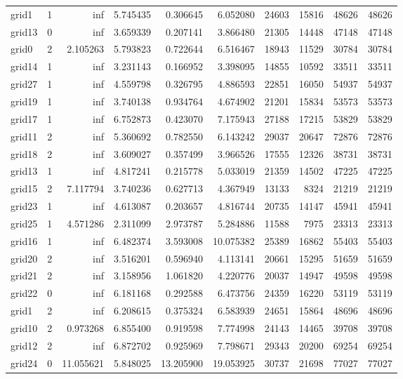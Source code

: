 \begin{longtable}{|l|r|r|r|r|r|r|r|r|r|}
grid1 & 1 & inf & 5.745435 & 0.306645 & 6.052080 & 24603 & 15816 & 48626 & 48626 \\
grid13 & 0 & inf & 3.659339 & 0.207141 & 3.866480 & 21305 & 14448 & 47148 & 47148 \\
grid0 & 2 & 2.105263 & 5.793823 & 0.722644 & 6.516467 & 18943 & 11529 & 30784 & 30784 \\
grid14 & 1 & inf & 3.231143 & 0.166952 & 3.398095 & 14855 & 10592 & 33511 & 33511 \\
grid27 & 1 & inf & 4.559798 & 0.326795 & 4.886593 & 22851 & 16050 & 54937 & 54937 \\
grid19 & 1 & inf & 3.740138 & 0.934764 & 4.674902 & 21201 & 15834 & 53573 & 53573 \\
grid17 & 1 & inf & 6.752873 & 0.423070 & 7.175943 & 27188 & 17215 & 53829 & 53829 \\
grid11 & 2 & inf & 5.360692 & 0.782550 & 6.143242 & 29037 & 20647 & 72876 & 72876 \\
grid18 & 2 & inf & 3.609027 & 0.357499 & 3.966526 & 17555 & 12326 & 38731 & 38731 \\
grid13 & 1 & inf & 4.817241 & 0.215778 & 5.033019 & 21359 & 14502 & 47225 & 47225 \\
grid15 & 2 & 7.117794 & 3.740236 & 0.627713 & 4.367949 & 13133 & 8324 & 21219 & 21219 \\
grid23 & 1 & inf & 4.613087 & 0.203657 & 4.816744 & 20735 & 14147 & 45941 & 45941 \\
grid25 & 1 & 4.571286 & 2.311099 & 2.973787 & 5.284886 & 11588 & 7975 & 23313 & 23313 \\
grid16 & 1 & inf & 6.482374 & 3.593008 & 10.075382 & 25389 & 16862 & 55403 & 55403 \\
grid20 & 2 & inf & 3.516201 & 0.596940 & 4.113141 & 20661 & 15295 & 51659 & 51659 \\
grid21 & 2 & inf & 3.158956 & 1.061820 & 4.220776 & 20037 & 14947 & 49598 & 49598 \\
grid22 & 0 & inf & 6.181168 & 0.292588 & 6.473756 & 24359 & 16220 & 53119 & 53119 \\
grid1 & 2 & inf & 6.208615 & 0.375324 & 6.583939 & 24651 & 15864 & 48696 & 48696 \\
grid10 & 2 & 0.973268 & 6.855400 & 0.919598 & 7.774998 & 24143 & 14465 & 39708 & 39708 \\
grid12 & 2 & inf & 6.872702 & 0.925969 & 7.798671 & 29343 & 20200 & 69254 & 69254 \\
grid24 & 0 & 11.055621 & 5.848025 & 13.205900 & 19.053925 & 30737 & 21698 & 77027 & 77027 \\

\end{longtable}
